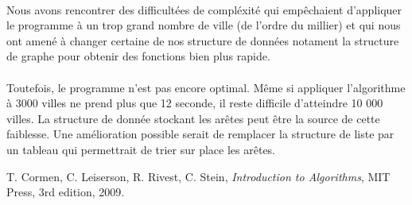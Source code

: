 \documentclass[a4paper]{article}
\begin{document}
\paragraph*{}
Nous avons rencontrer des difficultées de compléxité qui empêchaient d'appliquer le programme à un trop grand nombre de ville (de l'ordre du millier) et qui nous ont amené à changer certaine de nos structure de données notament la structure de graphe pour obtenir des fonctions bien plus rapide.
\paragraph*{}
Toutefois, le programme n'est pas encore optimal. Même si appliquer l'algorithme à 3000 villes ne prend plus que 12 seconde, il reste difficile d'atteindre 10 000 villes. La structure de donnée stockant les arêtes peut être la source de cette faiblesse. Une amélioration possible serait de remplacer la structure de liste par un tableau qui permettrait de trier sur place les arêtes.


\begin{thebibliography}{00}

  T. Cormen, C. Leiserson, R. Rivest, C. Stein,
  \textit{Introduction to Algorithms},
  MIT Press,
  3rd edition,
  2009.
\end{thebibliography}
\end{document}
